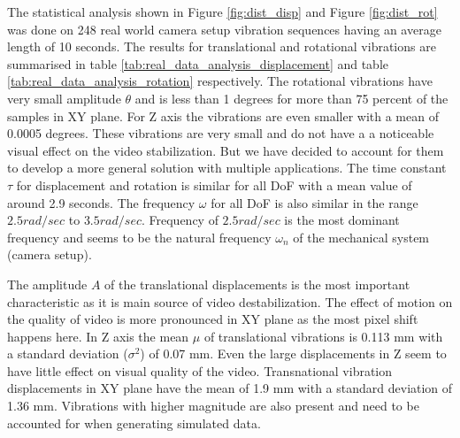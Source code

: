 The statistical analysis shown in Figure \ref{fig:dist_disp} and Figure \ref{fig:dist_rot} was done on 248 real world camera setup vibration sequences having an average length of 10 seconds. The results for translational and rotational vibrations are summarised in table \ref{tab:real_data_analysis_displacement} and table \ref{tab:real_data_analysis_rotation} respectively. The rotational vibrations have very small amplitude $ \theta $ and is less than 1 degrees for more than 75 percent of the samples in XY plane. For Z axis the vibrations are even smaller with a mean of 0.0005 degrees. These vibrations are very small and do not have a a noticeable visual effect on the video stabilization. But we have decided to account for them to develop a more general solution with multiple applications. The time constant $ \tau $ for displacement and rotation is similar for all DoF with a mean value of around 2.9 seconds.  The frequency $ \omega $ for all DoF is also similar in the range $ 2.5 rad/sec $ to $ 3.5 rad/sec $. Frequency of $ 2.5 rad/sec $ is the most dominant frequency and seems to be the natural frequency $ \omega_n $ of the mechanical system (camera setup).


The amplitude $ A $ of the translational displacements is the most important characteristic as it is main source of video destabilization. The effect of motion on the quality of video is more pronounced in XY plane as the most pixel shift happens here. In Z axis the mean $ \mu $ of translational vibrations is 0.113 mm with a standard deviation ($ \sigma^{2} $) of 0.07 mm. Even the large displacements in Z seem to have little effect on visual quality of the video. Transnational vibration displacements in XY plane have the mean of 1.9 mm with a standard deviation of 1.36 mm. Vibrations with higher magnitude are also present and need to be accounted for when generating simulated data.

